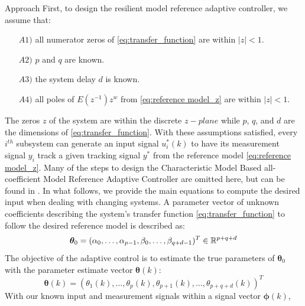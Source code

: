 \begin{section}{Approach}
First, to design the resilient model reference adaptive controller, we assume that:
	\begin{enumerate}%
	\item[$A1)$] all numerator zeros of \eqref{eq:transfer_function} are within $|z|<1$.
	\item[$A2)$] $p$ and $q$ are known. 
	\item[$A3)$] the system delay $d$ is known.
	\item[$A4)$] all poles of $E(z^{-1})z^w$ from \eqref{eq:reference model_z} are within $|z|<1$.
	\end{enumerate}
The zeros $z$ of the system are within the discrete $z-plane$ while $p$, $q$, and $d$ are the dimensions of \eqref{eq:transfer_function}. With these assumptions satisfied, every $i^{th}$ subsystem can generate an input signal $u^*_i(k)$ to have its measurement signal $y_i$ track a given tracking signal $y^*$ from the reference model \eqref{eq:reference model_z}. Many of the steps to design the Characteristic Model Based all-coefficient Model Reference Adaptive Controller are omitted here, but can be found in \cite{tao2003adaptive,Goodwin1643720}. In what follows, we provide the main equations to compute the desired input when dealing with changing systems. A parameter vector of unknown coefficients describing the system's transfer function \eqref{eq:transfer_function} to follow the desired reference model is described as:
    \begin{equation}
	\bm{\theta}_0=(\alpha_0, \dots ,\alpha_{p-1},\beta_0, \dots ,\beta_{q+d-1})^T \in \mathbb{R}^{p+q+d}
	\end{equation}
The objective of the adaptive control is to estimate the true parameters of $\bm{\theta}_0$ with the parameter estimate vector $\bm{\theta}(k)$:
    \begin{equation}
    \bm{\theta}(k)=(\theta_1(k), \dots ,\theta_p(k),\theta_{p+1}(k), \dots ,\theta_{p+q+d}(k))^T
	\end{equation}
With our known input and measurement signals within a signal vector $\bm{\phi}(k)$,
    

\end{section}
